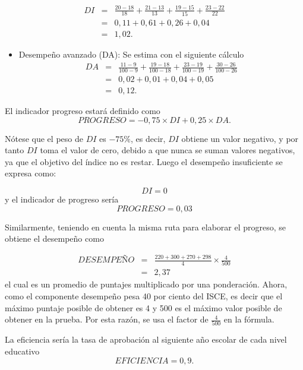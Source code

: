 \documentclass[
  11pt,
]{book}
\providecommand{\tightlist}{%
  \setlength{\itemsep}{0pt}\setlength{\parskip}{0pt}}
\begin{document}
\[\begin{eqnarray}
DI&=&\frac{20-18}{18}+\frac{21-13}{13}+\frac{19-15}{15}+\frac{23-22}{22}\\
&=&0,11+0,61+0,26+0,04\\
&=&1,02.
\end{eqnarray}\]

\begin{itemize}
\tightlist
\item
  Desempeño avanzado (DA): Se estima con el siguiente cálculo
  \[\begin{eqnarray}
  DA&=&\frac{11-9}{100-9}+\frac{19-18}{100-18}+\frac{23-19}{100-19}+\frac{30-26}{100-26}\\
  &=&0,02+0,01+0,04+0,05\\&=&0,12.
  \end{eqnarray}\]
\end{itemize}

El indicador progreso estará definido como
\[\begin{equation}
PROGRESO=  -0,75\times DI+0,25\times DA.
\end{equation}\]

Nótese que el peso de \(DI\) es \(-75\%\), es decir, \(DI\) obtiene un valor negativo, y por tanto \(DI\) toma el valor de cero, debido a que nunca se suman valores negativos, ya que el objetivo del índice no es restar. Luego el desempeño insuficiente se expresa como:

\[\begin{equation}
DI=0
\end{equation}\]
y el indicador de progreso sería
\[\begin{equation}
PROGRESO=  0,03
\end{equation}\]

Similarmente, teniendo en cuenta la misma ruta para elaborar el progreso, se obtiene el desempeño como

\[\begin{eqnarray}
DESEMPEÑO&=&  \frac{220+300+270+298}{4}\times \frac{4}{500}\\
&=& 2,37
\end{eqnarray}\]
el cual es un promedio de puntajes multiplicado por una ponderación. Ahora, como el componente desempeño pesa 40 por ciento del ISCE, es
decir que el máximo puntaje posible de obtener es 4 y 500 es el máximo valor posible de obtener en la prueba. Por esta razón, se usa el factor de \(\frac{4}{500}\) en la fórmula.

La eficiencia sería la tasa de aprobación al siguiente año escolar de cada nivel educativo
\[\begin{equation}
EFICIENCIA= 0,9.
\end{equation}\]
\end{document}
